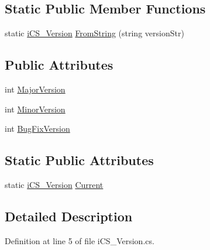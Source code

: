 \subsection*{Static Public Member Functions}
\begin{DoxyCompactItemize}
\item 
static \hyperlink{classi_c_s___version}{i\+C\+S\+\_\+\+Version} \hyperlink{classi_c_s___version_ac6d03e9e699d9bc7261cab4cd0aaf1a5}{From\+String} (string version\+Str)
\end{DoxyCompactItemize}
\subsection*{Public Attributes}
\begin{DoxyCompactItemize}
\item 
int \hyperlink{classi_c_s___version_ad0baa9814c3b5593ead592c8e75c65fa}{Major\+Version}
\item 
int \hyperlink{classi_c_s___version_a7b5bf7f3f699f3e42eb538f1429e3099}{Minor\+Version}
\item 
int \hyperlink{classi_c_s___version_a7cb99852bb9fc9b75d149a40cad37839}{Bug\+Fix\+Version}
\end{DoxyCompactItemize}
\subsection*{Static Public Attributes}
\begin{DoxyCompactItemize}
\item 
static \hyperlink{classi_c_s___version}{i\+C\+S\+\_\+\+Version} \hyperlink{classi_c_s___version_ad6ae63878570491950d2452fe6ba7cb1}{Current}
\end{DoxyCompactItemize}


\subsection{Detailed Description}


Definition at line 5 of file i\+C\+S\+\_\+\+Version.\+cs.



